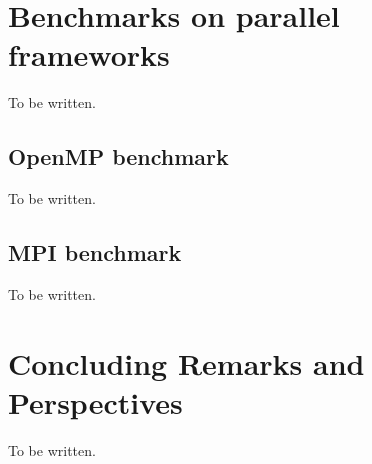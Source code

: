 \documentclass[pdftex,preprint,3p,times,numbers]{elsarticle}
\begin{document}
\clearpage

\section{Benchmarks on parallel frameworks}\label{sec:parallel}

{\color{red} To be written.}

\subsection{OpenMP benchmark}\label{subsec:openmp}

{\color{red} To be written.}

\subsection{MPI benchmark}\label{subsec:mpi}

{\color{red} To be written.}

\section{Concluding Remarks and Perspectives}\label{sec:conclusions}

{\color{red} To be written.}



\end{document}
